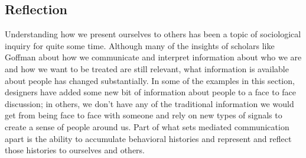 \documentclass{tufte-handout}
\begin{document}







% 

%



%


\subsection{Reflection}

Understanding how we present ourselves to others has been a topic of sociological inquiry for quite some time. Although many of the insights of scholars like Goffman \cite{goffman_presentation_of_self} \cite{someone_else} about how we communicate and interpret information about who we are and how we want to be treated are still relevant, what information is available about people has changed substantially. In some of the examples in this section, designers have added some new bit of information about people to a face to face discussion; in others, we don't have any of the traditional information we would get from being face to face with someone and rely on new types of signals to create a sense of people around us. Part of what sets mediated communication apart is the ability to accumulate behavioral histories and represent and reflect those histories to ourselves and others.
\end{document}
